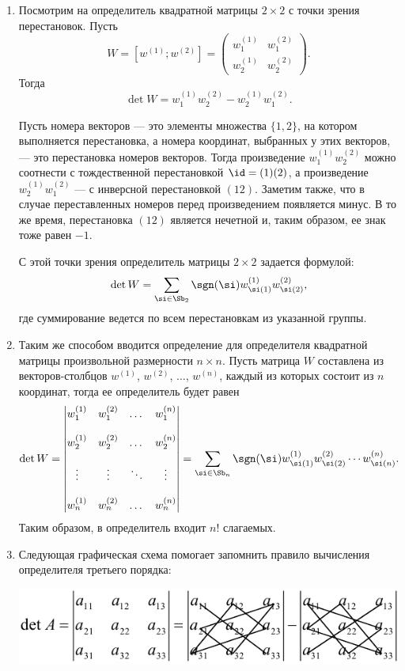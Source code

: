 \begin{enumerate}
\item Посмотрим на определитель квадратной матрицы $2\times 2$ с точки зрения перестановок. Пусть
$$
W=[w^{(1)};w^{(2)}]=\begin{pmatrix}
w^{(1)}_1 & w^{(2)}_1 \\[12pt]
w^{(1)}_2 & w^{(2)}_2
\end{pmatrix}.
$$
Тогда
$$
\det W = w^{(1)}_1w^{(2)}_2 - w^{(1)}_2w^{(2)}_1.
$$

Пусть номера векторов --- это элементы множества $\{1,2\}$, на котором выполняется перестановка, а номера координат, выбранных у этих векторов, --- это перестановка номеров векторов. Тогда произведение $w^{(1)}_1w^{(2)}_2$ можно соотнести с тождественной перестановкой $\id=(1)(2)$, а произведение $w^{(1)}_2w^{(2)}_1$ --- с инверсной перестановкой $(12)$. Заметим также, что в случае переставленных номеров перед произведением появляется минус. В то же время, перестановка $(12)$ является нечетной и, таким образом, ее знак тоже равен $-1$.

С этой точки зрения определитель матрицы $2\times 2$ задается формулой:
$$
\det W = \sum_{\si\in\Sb_2}\sgn(\si)w^{(1)}_{\si(1)}w^{(2)}_{\si(2)},
$$
где суммирование ведется по всем перестановкам из указанной группы.


\item Таким же способом вводится определение для определителя квадратной матрицы произвольной размерности $n\times n$. Пусть матрица $W$ составлена из векторов-столбцов $w^{(1)}$, $w^{(2)}$, $\dots$, $w^{(n)}$, каждый из которых состоит из $n$ координат, тогда ее определитель будет равен
\begin{equation}\label{DetDef}
\det W=\begin{vmatrix}
w^{(1)}_1 & w^{(2)}_1 & \dots & w^{(n)}_1 \\[12pt]
w^{(1)}_2 & w^{(2)}_2 & \dots & w^{(n)}_2 \\[12pt]
\vdots & \vdots & \ddots & \vdots \\[12pt]
w^{(1)}_n & w^{(2)}_n & \dots & w^{(n)}_n
\end{vmatrix} =
\sum_{\si\in\Sb_n}\sgn(\si)w^{(1)}_{\si(1)}w^{(2)}_{\si(2)}\cdots w^{(n)}_{\si(n)}.
\end{equation}
Таким образом, в определитель входит $n!$ слагаемых.

\item Следующая графическая схема помогает запомнить правило вычисления определителя третьего порядка:
\begin{center}
\includegraphics[scale=0.7]{det.png}


\end{center}
\end{enumerate}
